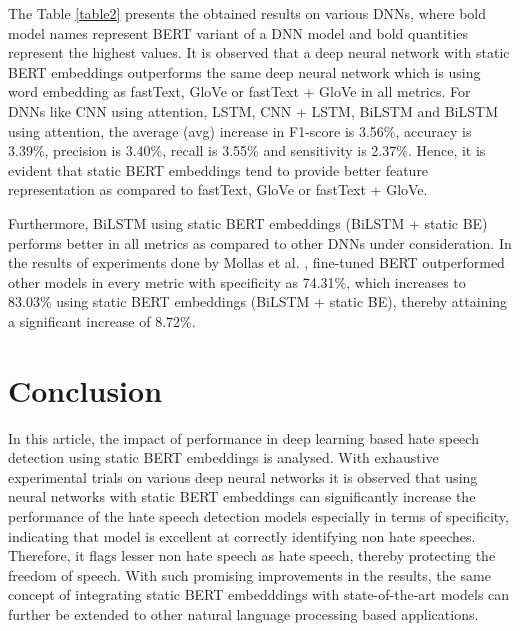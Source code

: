 \documentclass[runningheads]{llncs}
\begin{document}
The Table \ref{table2} presents the obtained results on various DNNs, where bold model names represent BERT variant of a DNN model and bold quantities represent the highest values. It is observed that a deep neural network with static BERT embeddings outperforms the same deep neural network which is using word embedding as fastText, GloVe or fastText + GloVe in all metrics. For DNNs like CNN using attention, LSTM, CNN + LSTM, BiLSTM and BiLSTM using attention, the average (avg) increase in F1-score is 3.56\%, accuracy is 3.39\%, precision is 3.40\%, recall is 3.55\% and sensitivity is 2.37\%. Hence, it is evident that static BERT embeddings tend to provide better feature representation as compared to fastText, GloVe or fastText + GloVe. 

Furthermore, BiLSTM using static BERT embeddings (BiLSTM + static BE) performs better in all metrics as compared to other DNNs under consideration. In the results of experiments done by Mollas et al. \cite{mollas2020ethos}, fine-tuned BERT outperformed other models in every metric with specificity as 74.31\%, which increases to 83.03\% using static BERT embeddings (BiLSTM + static BE), thereby attaining a significant increase of 8.72\%.

\section{Conclusion}
In this article, the impact of performance in deep learning based hate speech detection using static BERT embeddings is analysed. With exhaustive experimental trials on various deep neural networks it is observed that using neural networks with static BERT embeddings can significantly increase the performance of the hate speech detection models especially in terms of specificity, indicating that model is excellent at correctly identifying non hate speeches. Therefore, it flags lesser non hate speech as hate speech, thereby protecting the freedom of speech. With such promising improvements in the results, the same concept of integrating static BERT embedddings with state-of-the-art models can further be extended to other natural language processing based applications.



\end{document}
